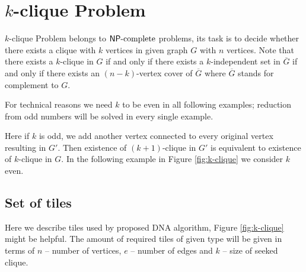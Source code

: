 \section{$k$-clique Problem}

$k$-clique Problem belongs to $\mathsf{NP}\textnormal{-complete}$ problems, its task is to decide whether there exists a clique with $k$ vertices in given graph $G$ with $n$ vertices. Note that there exists a $k$-clique in $G$ if and only if there exists a $k$-independent set in $\overline{G}$ if and only if there exists an $(n-k)$-vertex cover of $\overline{G}$ where $\overline{G}$ stands for complement to $G$.

For technical reasons we need $k$ to be even in all following examples; reduction from odd numbers will be solved in every single example.

Here if $k$ is odd, we add another vertex connected to every original vertex resulting in $G'$. Then existence of $(k+1)$-clique in $G'$ is equivalent to existence of $k$-clique in $G$. In the following example in Figure \ref{fig:k-clique} we consider $k$ even.


\subsection*{Set of tiles}

Here we describe tiles used by proposed DNA algorithm, Figure \ref{fig:k-clique} might be helpful. The amount of required tiles of given type will be given in terms of $n$ -- number of vertices, $e$ -- number of edges and $k$ -- size of seeked clique.

